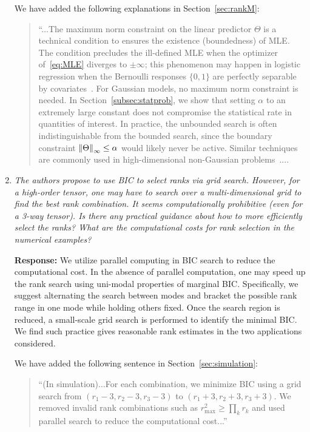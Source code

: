 \documentclass[11pt]{article}
\theoremstyle{plain}
\theoremstyle{definition}
\begin{document}
\begin{enumerate}[wide, labelwidth=!, labelindent=0pt]
    
    We have added the following explanations in Section~\ref{sec:rankM}:
    \begin{quote}
      ``...The maximum norm constraint on the linear predictor $\Theta$ is a technical condition to ensures the existence (boundedness) of MLE. The condition precludes the ill-defined MLE when the optimizer of~\eqref{eq:MLE} diverges to $\pm \infty$; this phenomenon may happen in logistic regression when the Bernoulli responses $\{0,1\}$ are perfectly separable by covariates~\citep{wang2020learning}. For Gaussian models, no maximum norm constraint is needed. In Section~\ref{subsec:statprob}, we show that setting $\alpha$ to an extremely large constant does not compromise the statistical rate in quantities of interest. In practice, the unbounded search is often indistinguishable from the bounded search, since the boundary constraint $\left\lVert\Theta\right\rVert_{\infty} \leq \alpha$ would likely never be active. Similar techniques are commonly used in high-dimensional non-Gaussian problems~\citep{wang2020learning,han2020optimal}....
    \end{quote}
    
    \item \textit{The authors propose to use BIC to select ranks via grid search. However, for a high-order tensor, one may have to search over a multi-dimensional grid to find the best rank combination. It seems computationally prohibitive (even for a 3-way tensor). Is there any practical guidance about how to more efficiently select the ranks? What are the computational costs for rank selection in the numerical examples? } 
    
    \textbf{Response:} We utilize parallel computing in BIC search to reduce the computational cost. In the absence of parallel computation, one may speed up the rank search using uni-modal properties of marginal BIC. Specifically, we suggest alternating the search between modes and bracket the possible rank range in one mode while holding others fixed. Once the search region is reduced, a small-scale grid search is performed to identify the minimal BIC. We find such practice gives reasonable rank estimates in the two applications considered. 
    
    We have added the following sentence in  Section~\ref{sec:simulation}:
    \begin{quote}
     ``(In simulation)...For each combination, we minimize BIC using a grid search from $(r_1-3, r_2-3, r_3-3)$ to $(r_1+3, r_2+3, r_3+3)$. We removed invalid rank combinations such as $r^2_{\max} \geq \prod_k r_k$ and used parallel search to reduce the computational cost...''
    \end{quote}
    

\end{enumerate}
\end{document}
